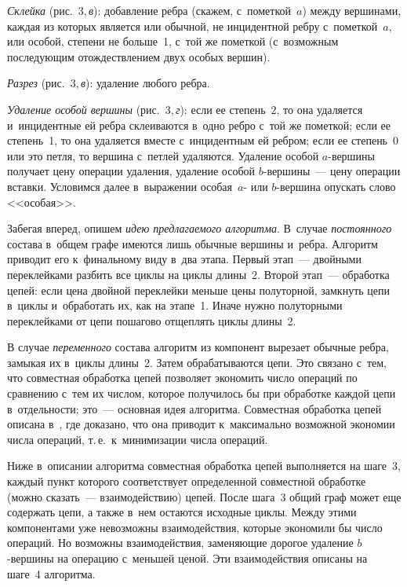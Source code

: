 \begin{multicols}{2}
\textit{Склейка} (рис.~3,\,\textit{в}): добавление реб\-ра 
(скажем, с~пометкой~$a$) между вершинами, каждая из которых является или 
обычной, не инцидентной ребру с~пометкой~$a$, или особой, степени не 
больше~1, с~той же пометкой (с~возможным последующим отождествлением 
двух особых вершин). 

\textit{Разрез} (рис.~3,\,\textit{в}): удаление любого 
реб\-ра. 

\textit{Удаление особой вершины} (рис.~3,\,\textit{г}): если ее степень~2, 
то она удаляется и~инцидентные ей реб\-ра склеиваются в~одно реб\-ро с~той же 
пометкой; если ее степень~1, то она удаляется вместе с~инцидентным ей 
ребром; если ее степень~0 или это пет\-ля, то вершина с~пет\-лей удаляются. 
Удаление особой $a$-вер\-ши\-ны получает цену операции удаления, удаление 
особой $b$-вер\-ши\-ны~--- цену операции встав\-ки. Условимся далее 
в~выражении особая~$a$- или $b$-вер\-ши\-на опускать слово <<особая>>.
  
  Забегая вперед, опишем \textit{идею предлагаемого алгоритма}. В~случае 
\textit{постоянного} состава в~общем графе имеются лишь обычные вершины 
и~реб\-ра. Алгоритм приводит его к~финальному виду в~два этапа. Первый 
  этап~--- двойными переклейками разбить все циклы на циклы длины~2. 
Второй этап~--- обработка цепей: если цена двойной переклейки меньше цены 
полуторной, замкнуть цепи в~циклы и~обработать их, как на этапе~1. Иначе 
нужно полуторными переклейками от цепи пошагово отщеплять циклы 
длины~2.
  
  В случае \textit{переменного} состава алгоритм из компонент вырезает 
обычные реб\-ра, замыкая их в~циклы длины~2. Затем обрабатываются цепи. Это 
связано с~тем, что совместная обработка цепей позволяет экономить число 
операций по сравнению с~тем их числом, которое получилось бы при обработке 
каждой цепи в~отдельности; это~--- основная идея алгоритма. Совместная 
обработка цепей описана в~\cite{2-gor}, где доказано, что она приводит 
к~максимально возможной экономии числа операций, т.\,е.\ к~минимизации 
числа операций. 

Ниже в~описании алгоритма совместная обработка цепей 
выполняется на шаге~3, каждый пункт которого соответствует определенной 
совместной обработке (можно сказать~--- взаимодействию) цепей. После 
шага~3 общий граф может еще содержать цепи, а также в~нем остаются 
исходные циклы. Между этими компонентами уже невозможны 
взаимодействия, которые экономили бы число операций. Но возможны 
взаимодействия, заменяющие дорогое удаление $b$-вер\-ши\-ны на операцию 
с~меньшей ценой. Эти взаимодействия описаны на шаге~4 алгоритма.
  

\end{multicols}
